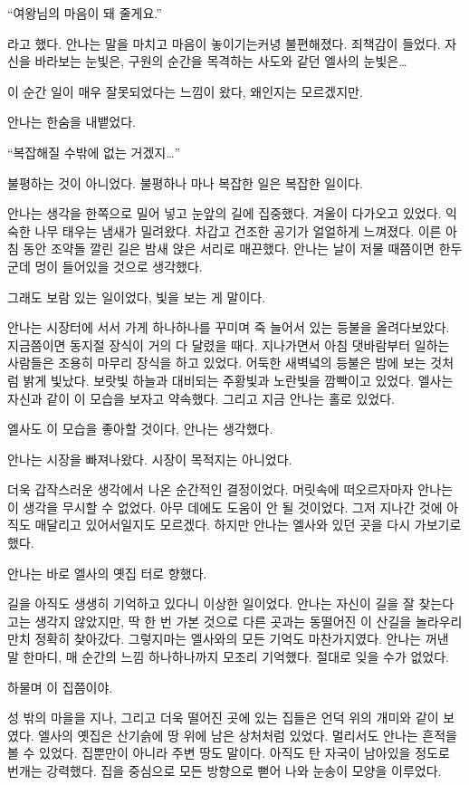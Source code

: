 ``여왕님의 마음이 돼 줄게요.''

라고 했다. 안나는 말을 마치고 마음이 놓이기는커녕 불편해졌다. 죄책감이 들었다. 자신을 바라보는 눈빛은, 구원의 순간을 목격하는 사도와 같던 엘사의 눈빛은\ldots

이 순간 일이 매우 잘못되었다는 느낌이 왔다, 왜인지는 모르겠지만.

안나는 한숨을 내뱉었다.

``복잡해질 수밖에 없는 거겠지\ldots''

불평하는 것이 아니었다. 불평하나 마나 복잡한 일은 복잡한 일이다.

안나는 생각을 한쪽으로 밀어 넣고 눈앞의 길에 집중했다. 겨울이 다가오고 있었다. 익숙한 나무 태우는 냄새가 밀려왔다. 차갑고 건조한 공기가 얼얼하게 느껴졌다. 이른 아침 동안 조약돌 깔린 길은 밤새 앉은 서리로 매끈했다. 안나는 날이 저물 때쯤이면 한두 군데 멍이 들어있을 것으로 생각했다.

그래도 보람 있는 일이었다, 빛을 보는 게 말이다.

안나는 시장터에 서서 가게 하나하나를 꾸미며 죽 늘어서 있는 등불을 올려다보았다. 지금쯤이면 동지절 장식이 거의 다 달렸을 때다. 지나가면서 아침 댓바람부터 일하는 사람들은 조용히 마무리 장식을 하고 있었다. 어둑한 새벽녘의 등불은 밤에 보는 것처럼 밝게 빛났다. 보랏빛 하늘과 대비되는 주황빛과 노란빛을 깜빡이고 있었다. 엘사는 자신과 같이 이 모습을 보자고 약속했다. 그리고 지금 안나는 홀로 있었다.

엘사도 이 모습을 좋아할 것이다, 안나는 생각했다.

안나는 시장을 빠져나왔다. 시장이 목적지는 아니었다.

더욱 갑작스러운 생각에서 나온 순간적인 결정이었다. 머릿속에 떠오르자마자 안나는 이 생각을 무시할 수 없었다. 아무 데에도 도움이 안 될 것이었다. 그저 지나간 것에 아직도 매달리고 있어서일지도 모르겠다. 하지만 안나는 엘사와 있던 곳을 다시 가보기로 했다.

안나는 바로 엘사의 옛집 터로 향했다.

길을 아직도 생생히 기억하고 있다니 이상한 일이었다. 안나는 자신이 길을 잘 찾는다고는 생각지 않았지만, 딱 한 번 가본 것으로 다른 곳과는 동떨어진 이 산길을 놀라우리만치 정확히 찾아갔다. 그렇지마는 엘사와의 모든 기억도 마찬가지였다. 안나는 꺼낸 말 한마디, 매 순간의 느낌 하나하나까지 모조리 기억했다. 절대로 잊을 수가 없었다.

하물며 이 집쯤이야.

성 밖의 마을을 지나, 그리고 더욱 떨어진 곳에 있는 집들은 언덕 위의 개미와 같이 보였다. 엘사의 옛집은 산기슭에 땅 위에 남은 상처처럼 있었다. 멀리서도 안나는 흔적을 볼 수 있었다. 집뿐만이 아니라 주변 땅도 말이다. 아직도 탄 자국이 남아있을 정도로 번개는 강력했다. 집을 중심으로 모든 방향으로 뻗어 나와 눈송이 모양을 이루었다.

